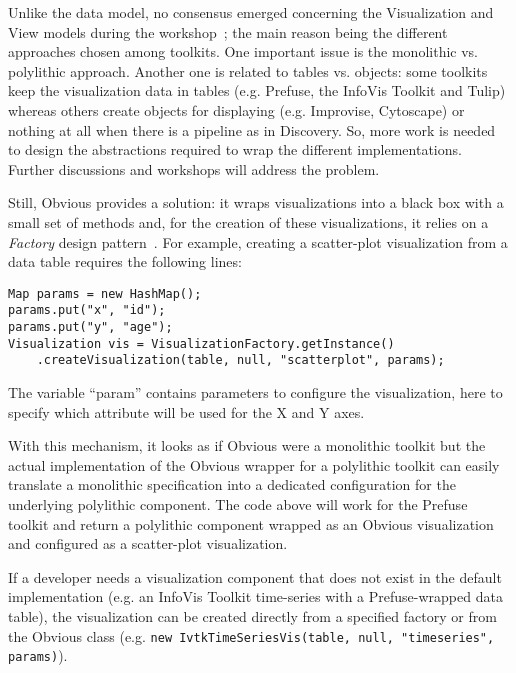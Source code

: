 \label{sec:viewvis}
Unlike the data model, no consensus emerged concerning the
Visualization and View models during the
workshop~\cite{vismaster2008}; the main reason being the different
approaches chosen among toolkits.  One important issue is the
monolithic vs. polylithic approach. Another one is related to tables
vs. objects: some toolkits keep the visualization data in tables
(e.g. Prefuse, the InfoVis Toolkit and Tulip) whereas others create
objects for displaying (e.g. Improvise, Cytoscape) or nothing at all
when there is a pipeline as in Discovery.  So, more work is needed to
design the abstractions required to wrap the different
implementations.  Further discussions and workshops will address the
problem.

Still, Obvious provides a solution: it wraps visualizations into a
black box with a small set of methods and, for the creation of these
visualizations, it relies on a \emph{Factory} design
pattern~\cite{DesignPatterns}.  For example, creating a scatter-plot
visualization from a data table requires the following lines:
\begin{lstlisting}
Map params = new HashMap();
params.put("x", "id");
params.put("y", "age");
Visualization vis = VisualizationFactory.getInstance()
    .createVisualization(table, null, "scatterplot", params);
\end{lstlisting}
The variable ``param'' contains parameters to configure the
visualization, here to specify which attribute will be used for the X
and Y axes.

With this mechanism, it looks as if Obvious were a monolithic toolkit
but the actual implementation of the Obvious wrapper for a polylithic
toolkit can easily translate a monolithic specification into a
dedicated configuration for the underlying polylithic component.  The
code above will work for the Prefuse toolkit and return a polylithic
component wrapped as an Obvious visualization and configured as a
scatter-plot visualization.

If a developer needs a visualization component that does not exist in
the default implementation (e.g. an InfoVis Toolkit time-series with a
Prefuse-wrapped data table), the visualization can be created directly
from a specified factory or from the Obvious class
(e.g. \lstinline!new IvtkTimeSeriesVis(table, null, "timeseries", params)!).

